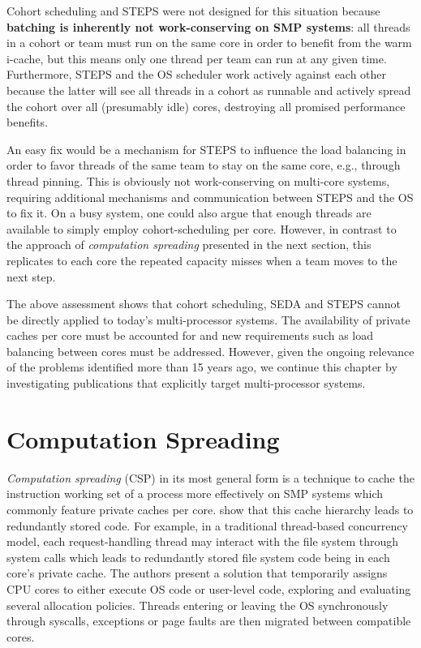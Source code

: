 \documentclass[12pt,a4paper]{book}
\begin{document}
Cohort scheduling and STEPS were not designed for this situation because
\textbf{batching is inherently not work-conserving on SMP systems}:
all threads in a cohort or team must run on the same core in order to benefit from the warm i-cache, but this means only one thread per team can run at any given time.
Furthermore, STEPS and the OS scheduler work actively against each other because the latter will see all threads in a cohort as runnable and actively spread the cohort over all (presumably idle) cores,
destroying all promised performance benefits.

An easy fix would be a mechanism for STEPS to influence the load balancing in order to favor threads of the same team to stay on the same core, e.g., through thread pinning.
This is obviously not work-conserving on multi-core systems, requiring additional mechanisms and communication between STEPS and the OS to fix it.
On a busy system, one could also argue that enough threads are available to simply employ cohort-scheduling per core.
However, in contrast to the approach of \emph{computation spreading} presented in the next section, this replicates to each core the repeated capacity misses when a team moves to the next step.

The above assessment shows that cohort scheduling, SEDA and STEPS cannot be directly applied to today's multi-processor systems.
The availability of private caches per core must be accounted for and new requirements such as load balancing between cores must be addressed.
However, given the ongoing relevance of the problems identified more than 15 years ago, we continue this chapter by investigating publications that explicitly target multi-processor systems.

\section{Computation Spreading}\label{ch:relwork:compspr}
\emph{Computation spreading} (CSP) in its most general form is a technique to cache the instruction working set of a process more effectively on SMP systems which commonly feature private caches per core.
\citeauthor*{compspr} show that this cache hierarchy leads to redundantly stored code.
For example, in a traditional thread-based concurrency model, each request-handling thread may interact with the file system through system calls which leads to redundantly stored file system code being in each core's private cache.
The authors present a solution that temporarily assigns CPU cores to either execute OS code or user-level code, exploring and evaluating several allocation policies.
Threads entering or leaving the OS synchronously through syscalls, exceptions or page faults are then migrated between compatible cores.~\cite{compspr}
\end{document}
